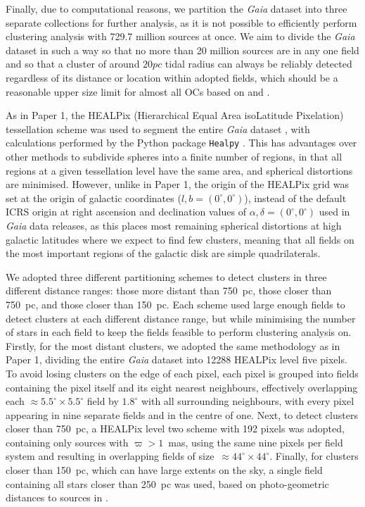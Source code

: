 Finally, due to computational reasons, we partition the \emph{Gaia} dataset into three separate collections for further analysis, as it is not possible to efficiently perform clustering analysis with 729.7 million sources at once. We aim to divide the \emph{Gaia} dataset in such a way so that no more than 20 million sources are in any one field and so that a cluster of around $20 pc$ tidal radius can always be reliably detected regardless of its distance or location within adopted fields, which should be a reasonable upper size limit for almost all OCs based on \cite{kharchenko_global_2013} and \cite{cantat-gaudin_clusters_2020}.

As in Paper 1, the HEALPix (Hierarchical Equal Area isoLatitude Pixelation) tessellation scheme was used to segment the entire \emph{Gaia} dataset \citep{gorski_healpix:_2005}, with calculations performed by the Python package \texttt{Healpy} \citep{zonca_healpy_2019}. This has advantages over other methods to subdivide spheres into a finite number of regions, in that all regions at a given tessellation level have the same area, and spherical distortions are minimised. However, unlike in Paper 1, the origin of the HEALPix grid was set at the origin of galactic coordinates ($l,b=(0^\circ,0^\circ)$), instead of the default ICRS origin at right ascension and declination values of $\alpha,\delta=(0^\circ,0^\circ)$ used in \emph{Gaia} data releases, as this places most remaining spherical distortions at high galactic latitudes where we expect to find few clusters, meaning that all fields on the most important regions of the galactic disk are simple quadrilaterals.

We adopted three different partitioning schemes to detect clusters in three different distance ranges: those more distant than 750~pc, those closer than 750~pc, and those closer than 150~pc. Each scheme used large enough fields to detect clusters at each different distance range, but while minimising the number of stars in each field to keep the fields feasible to perform clustering analysis on. Firstly, for the most distant clusters, we adopted the same methodology as in Paper 1, dividing the entire \emph{Gaia} dataset into 12288 HEALPix level five pixels. To avoid losing clusters on the edge of each pixel, each pixel is grouped into fields containing the pixel itself and its eight nearest neighbours, effectively overlapping each $\approx5.5^\circ \times 5.5^\circ$ field by $1.8^\circ$ with all surrounding neighbours, with every pixel appearing in nine separate fields and in the centre of one. Next, to detect clusters closer than 750~pc, a HEALPix level two scheme with 192 pixels was adopted, containing only sources with $\varpi>1$~mas, using the same nine pixels per field system and resulting in overlapping fields of size~$\approx44^\circ \times 44^\circ$. Finally, for clusters closer than 150~pc, which can have large extents on the sky, a single field containing all stars closer than 250~pc was used, based on photo-geometric distances to sources in \cite{bailer-jones_estimating_2021}.

